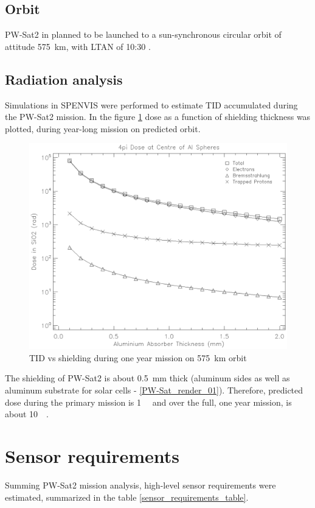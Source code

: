     \subsection{Orbit}
        PW-Sat2 in planned to be launched to a sun-synchronous circular orbit of attitude \SI{575}{\kilo\meter}, with LTAN of 10:30 \cite{PWSAT_MA_CDR}.


    \subsection{Radiation analysis}
        Simulations in SPENVIS \cite{SPENVIS_URL} were performed to estimate TID accumulated during the PW-Sat2 mission. In the figure \ref{TIDvsSheilding} dose as a function of shielding thickness was plotted, during year-long mission on predicted orbit.

        \begin{figure}[H]
            \centering
            \includegraphics[width=0.58\paperwidth]{img/04/dose.eps}
            \caption{TID vs shielding during one year mission on \SI{575}{\kilo\meter} orbit}
            \label{TIDvsSheilding}
        \end{figure}

        The shielding of PW-Sat2 is about \SI{0.5}{\milli\meter} thick (aluminum sides as well as aluminum substrate for solar cells - \ref{PW-Sat_render_01}). Therefore, predicted dose during the primary mission is \SI{1}{\kilo\rad} and over the full, one year mission, is about \SI{10}{\kilo\rad}.

\section{Sensor requirements}
    Summing PW-Sat2 mission analysis, high-level sensor requirements were estimated, summarized in the table \ref{sensor_requirements_table}.


